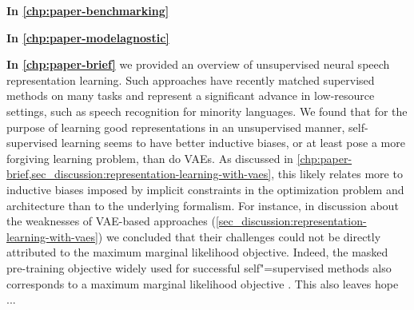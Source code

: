 \vspace{1em}
\textbf{In \cref{chp:paper-benchmarking}} 


\vspace{1em}
\textbf{In \cref{chp:paper-modelagnostic}} 

\vspace{1em}
\textbf{In \cref{chp:paper-brief}} we provided an overview of unsupervised neural speech representation learning. Such approaches have recently matched supervised methods on many tasks and represent a significant advance in low-resource settings, such as speech recognition for minority languages. 
We found that for the purpose of learning good representations in an unsupervised manner, self-supervised learning seems to have better inductive biases, or at least pose a more forgiving learning problem, than do VAEs. As discussed in \cref{chp:paper-brief,sec_discussion:representation-learning-with-vaes}, this likely relates more to inductive biases imposed by implicit constraints in the optimization problem and architecture than to the underlying formalism. 
For instance, in discussion about the weaknesses of VAE-based approaches (\cref{sec_discussion:representation-learning-with-vaes}) we concluded that their challenges could not be directly attributed to the maximum marginal likelihood objective. Indeed, the masked pre-training objective widely used for successful self"=supervised methods also corresponds to a maximum marginal likelihood objective \parencite{moreno-munoz_masked_2023}. 
This also leaves hope ... 

